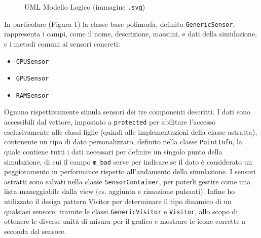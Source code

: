 \documentclass[10pt]{article}
\begin{document}
\texttt{}
\begin{figure}[h]

\caption{UML Modello Logico (immagine \texttt{.svg})}
\end{figure}
\newpage
In particolare (Figura 1) la classe base polimorfa, definita \texttt{GenericSensor},
rappresenta i campi, come il nome, descrizione, massimi, e dati della simulazione,
e i metodi comuni ai sensori concreti:
\begin{itemize}
    \item \texttt{CPUSensor}
    \item \texttt{GPUSensor}
    \item \texttt{RAMSensor}
\end{itemize}
Ognuno rispettivamente simula sensori dei tre componenti descritti.
I dati sono accessibili dal vettore, impostato a \texttt{protected} per
abilitare l'accesso esclusivamente alle classi figlie (quindi alle implementazioni
della classe astratta), contenente un tipo di dato personalizzato, definito nella
classe \texttt{PointInfo}, la quale contiene tutti i dati necessari per definire
un singolo punto della simulazione, di cui il campo \texttt{m\_bad} serve per indicare se
il dato è considerato un peggioramento in performance rispetto all'andamento
della simulazione. I sensori astratti sono salvati nella classe \texttt{SensorContainer},
per poterli gestire come una lista maneggiabile dalla view (es. aggiunta e rimozione pulsanti).
Infine ho utilizzato il design pattern Visitor per determinare il tipo dinamico
di un qualsiasi sensore, tramite le classi \texttt{GenericVisitor} e \texttt{Visitor},
allo scopo di ottenere le diverse unità di misura per il grafico e mostrare le icone
corrette a seconda del sensore.
\end{document}

